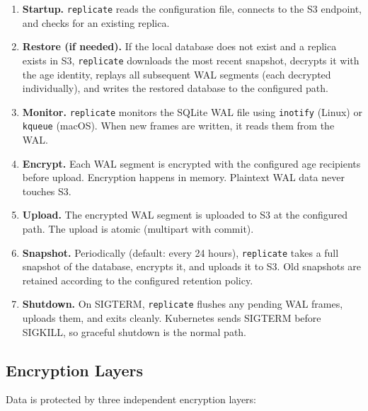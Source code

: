 \begin{enumerate}[nosep]
    \item \textbf{Startup.} \texttt{replicate} reads the configuration file,
    connects to the S3 endpoint, and checks for an existing replica.

    \item \textbf{Restore (if needed).} If the local database does not exist
    and a replica exists in S3, \texttt{replicate} downloads the most recent
    snapshot, decrypts it with the age identity, replays all subsequent WAL
    segments (each decrypted individually), and writes the restored database
    to the configured path.

    \item \textbf{Monitor.} \texttt{replicate} monitors the SQLite WAL file
    using \texttt{inotify} (Linux) or \texttt{kqueue} (macOS). When new
    frames are written, it reads them from the WAL.

    \item \textbf{Encrypt.} Each WAL segment is encrypted with the
    configured age recipients before upload. Encryption happens in memory.
    Plaintext WAL data never touches S3.

    \item \textbf{Upload.} The encrypted WAL segment is uploaded to S3 at the
    configured path. The upload is atomic (multipart with commit).

    \item \textbf{Snapshot.} Periodically (default: every 24 hours),
    \texttt{replicate} takes a full snapshot of the database, encrypts it,
    and uploads it to S3. Old snapshots are retained according to the
    configured retention policy.

    \item \textbf{Shutdown.} On SIGTERM, \texttt{replicate} flushes any
    pending WAL frames, uploads them, and exits cleanly. Kubernetes sends
    SIGTERM before SIGKILL, so graceful shutdown is the normal path.
\end{enumerate}

\subsection{Encryption Layers}

Data is protected by three independent encryption layers:

